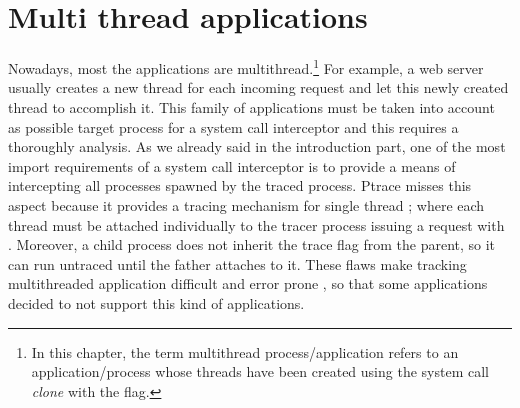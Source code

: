 \section{Multi thread applications}
\label{multi_thread_application}

 
Nowadays, most the applications are multithread.\footnote{In this chapter, the term multithread process/application refers to an application/process whose threads have been created using the system call \emph{clone} \cite{clone} with the  flag.} For example, a web server usually creates a new thread for each incoming request and let this newly created thread to accomplish it. This family of applications must be taken into account as possible target process for a system call interceptor and this requires a thoroughly analysis. As we already said in the introduction part, one of the most import requirements of a system call interceptor is to provide a means of intercepting all processes spawned by the traced process. Ptrace misses this aspect because it provides a tracing mechanism for single thread \cite{ptrace}; where each thread must be attached individually to the tracer process issuing a request with . Moreover, a child process does not inherit the trace flag from the parent, so it can run untraced until the father attaches to it. These flaws make tracking multithreaded application difficult and error prone \cite{garfinkel:traps}, so that some applications \cite{Noordende_asecure} decided to not support this kind of applications.

